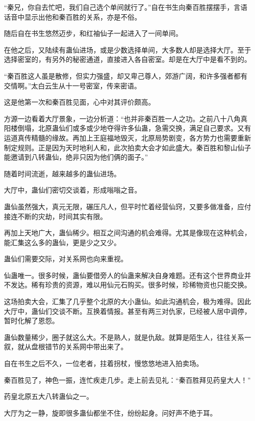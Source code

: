 
\begin{this_body}

“秦兄，你自去忙吧，我们自己选个单间就行了。”自在书生向秦百胜摆摆手，言语话音中显示出他和秦百胜的关系，亦是不俗。

随后自在书生悠然迈步，和红袖仙子一起进入了一间单间。

在他之后，又陆续有蛊仙进场，或是少数选择单间，大多数人却是选择大厅。至于选择密室的，有另外的秘密通道，直接进入各自密室。却是在大厅中是看不到的。

“秦百胜这人虽是散修，但实力强盛，却又卑己尊人，郊游广阔，和许多强者都有交情啊。”太白云生从十一号密室，传来密语。

这是他第一次和秦百胜见面，心中对其评价颇高。

方源一边看着大厅景象，一边分析道：“也并非秦百胜一人之功。之前八十八角真阳楼倒塌，北原蛊仙们或多或少地夺得许多仙蛊，急需交换，满足自己要求。又有运道真传精髓的缘故。再加上王庭福地毁灭，北原局势剧变，各方势力也需要重新制定规则。正是因为天时地利人和，此次拍卖大会才如此盛大。秦百胜和黎山仙子能邀请到八转蛊仙，绝非只因为他们俩的面子。”

随着时间流逝，越来越多的蛊仙进场。

大厅中，蛊仙们密切交谈着，形成嗡嗡之音。

蛊仙虽然强大，真元无限，碾压凡人，但平时忙着经营仙窍，又要多做准备，应付接连不断的灾劫，时间其实有限。

再加上天地广大，蛊仙稀少。相互之间沟通的机会难得。尤其是像现在这种机会，能汇集这么多的蛊仙，更是少之又少。

蛊仙们需要交际，对关系网也向来重视。

仙蛊唯一。很多时候，蛊仙要借旁人的仙蛊来解决自身难题。还有这个世界商业并不发达。稀有珍贵的资源，难以用仙元石购买。很多时候，珍稀物资也只能交换。

这场拍卖大会，汇集了几乎整个北原的大小蛊仙。如此沟通机会，极为难得。因此大厅中，蛊仙们交谈不断。互换着情报。甚至有两三对仇家，已经被人居中调停，暂时化解了恩怨。

蛊仙数量稀少，圈子就这么大。不是熟人，就是仇敌。就算是陌生人，往往关系一叙，就从盘根错节的关系网中带出来了。

自在书生之后不久，一位老者，拄着拐杖，慢悠悠地进入拍卖场。

秦百胜见了，神色一振，连忙疾走几步。走上前去见礼：“秦百胜拜见药皇大人！”

药皇北原五大八转蛊仙之一。

大厅为之一静，旋即很多蛊仙都坐不住，纷纷起身。问好声不绝于耳。


\end{this_body}
